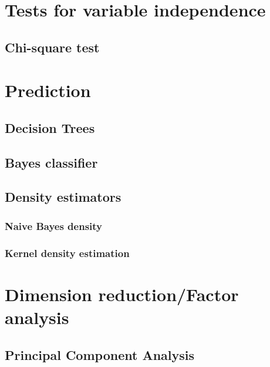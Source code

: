 \documentclass[12pt]{article}
\begin{document}
\newpage
\section{Tests for variable independence}
\subsection{Chi-square test}

\newpage
\section{Prediction}
\subsection{Decision Trees}
\subsection{Bayes classifier}
\subsection{Density estimators}
\subsubsection{Naive Bayes density}
\subsubsection{Kernel density estimation}

\newpage
\section{Dimension reduction/Factor analysis}
\subsection{Principal Component Analysis}
\end{document}
